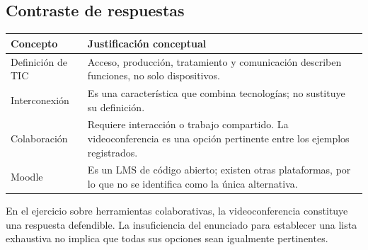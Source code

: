 {\subsection{Contraste de respuestas}
\noindent\begin{tabularx}{\textwidth}{@{}p{}X@{}}\toprule
Concepto & Justificación conceptual\\\midrule
Definición de TIC & Acceso, producción, tratamiento y comunicación describen funciones, no solo dispositivos.\\
Interconexión & Es una característica que combina tecnologías; no sustituye su definición.\\
Colaboración & Requiere interacción o trabajo compartido. La videoconferencia es una opción pertinente entre los ejemplos registrados.\\
Moodle & Es un LMS de código abierto; existen otras plataformas, por lo que no se identifica como la única alternativa.\\\bottomrule
\end{tabularx}
\par\medskip
En el ejercicio sobre herramientas colaborativas, la videoconferencia constituye una respuesta defendible. La insuficiencia del enunciado para establecer una lista exhaustiva no implica que todas sus opciones sean igualmente pertinentes.
}
\newcommand{\actividadcierre}{%
\section{Conclusiones}
Las TIC deben comprenderse por sus funciones y relaciones: procesar información, conectar personas y facilitar tareas. La colaboración exige más que disponer de equipos; necesita comunicación, acceso compartido y coordinación. Distinguir actividad y recurso en un LMS permite interpretar mejor qué debe consultarse y qué requiere participación.\footnote{Se utilizó el chat de GitHub Copilot para la corrección y organización documental a partir del registro de trabajo proporcionado por el estudiante.}
\clearpage}
